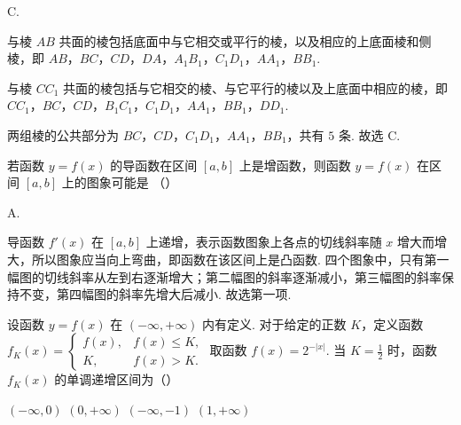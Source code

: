 \begin{answer}
C.
\end{answer}

\begin{solution}
与棱 \(AB\) 共面的棱包括底面中与它相交或平行的棱，以及相应的上底面棱和侧棱，即
\(AB\)，\(BC\)，\(CD\)，\(DA\)，\(A_1B_1\)，\(C_1D_1\)，\(AA_1\)，\(BB_1\).

与棱 \(CC_1\) 共面的棱包括与它相交的棱、与它平行的棱以及上底面中相应的棱，即
\(CC_1\)，\(BC\)，\(CD\)，\(B_1C_1\)，\(C_1D_1\)，\(AA_1\)，\(BB_1\)，\(DD_1\).

两组棱的公共部分为 \(BC\)，\(CD\)，\(C_1D_1\)，\(AA_1\)，\(BB_1\)，共有 \(5\) 条. 故选 C.
\end{solution}

\begin{problem}
若函数 \( y = f(x) \) 的导函数在区间 \([a, b]\) 上是增函数，则函数 \( y = f(x) \) 在区间 \([a, b]\) 上的图象可能是 （\quad）

    {}
    {}
    {}
\end{problem}

\begin{answer}
A.
\end{answer}

\begin{solution}
导函数 \(f'(x)\) 在 \([a,b]\) 上递增，表示函数图象上各点的切线斜率随 \(x\) 增大而增大，所以图象应当向上弯曲，即函数在该区间上是凸函数. 四个图象中，只有第一幅图的切线斜率从左到右逐渐增大；第二幅图的斜率逐渐减小，第三幅图的斜率保持不变，第四幅图的斜率先增大后减小. 故选第一项.
\end{solution}

\begin{problem}
设函数 \( y = f(x) \) 在 \((- \infty, + \infty)\) 内有定义. 对于给定的正数 \(K\)，定义函数 \( f_{K}(x) = \begin{cases}
f(x), & f(x) \leqslant K,\\
K, & f(x) > K.
\end{cases}\) 取函数 \( f(x) = 2^{-|x|} \). 当 \( K = \frac{1}{2} \) 时，函数 \( f_{K}(x) \) 的单调递增区间为（\quad）

\choices
    {\((-\infty, 0)\)}
    {\((0, +\infty)\)}
    {\((-\infty, -1)\)}
    {\((1, +\infty)\)}
\end{problem}

